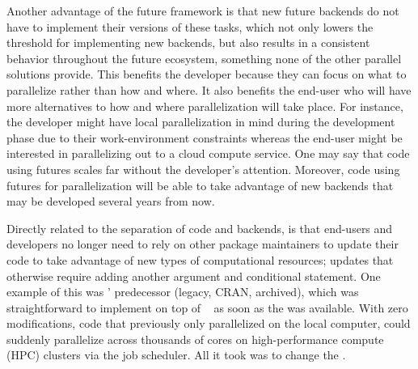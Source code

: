 Another advantage of the future framework is that new future backends
do not have to implement their versions of these tasks, which not only
lowers the threshold for implementing new backends, but also results
in a consistent behavior throughout the future ecosystem, something
none of the other parallel solutions provide.  This benefits the
developer because they can focus on what to parallelize rather than
how and where. It also benefits the end-user who will have more
alternatives to how and where parallelization will take place.  For
instance, the developer might have local parallelization in mind during
the development phase due to their work-environment constraints
whereas the end-user might be interested in parallelizing out to a
cloud compute service.  One may say that code using futures scales far
without the developer's attention.  Moreover, code using futures for
parallelization will be able to take advantage of new backends that
may be developed several years from now.

Directly related to the separation of code and backends, is that
end-users and developers no longer need to rely on other package
maintainers to update their code to take advantage of new types of
computational resources; updates that otherwise require adding another
argument and conditional statement.  One example of this
was ' predecessor 
(legacy, CRAN, archived), which was straightforward to implement on
top of ~\citep{Bischl_etal_2015} as soon as
the  was available.  With zero modifications, code
that previously only parallelized on the local computer, could
suddenly parallelize across thousands of cores on high-performance
compute (HPC) clusters via the job scheduler.  All it took was to
change the .


